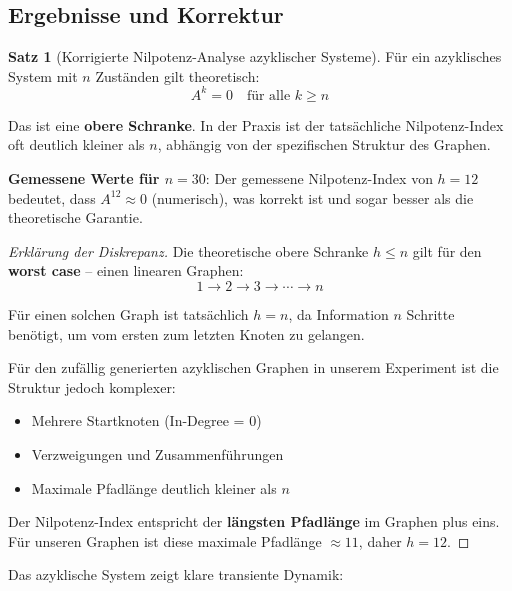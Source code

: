 ﻿\documentclass[a4paper,12pt]{report}
\theoremstyle{definition}
\newtheorem{satz}{Satz}
\begin{document}
	\subsection{Ergebnisse und Korrektur}
	
	\begin{satz}[Korrigierte Nilpotenz-Analyse azyklischer Systeme]
		Für ein azyklisches System mit $n$ Zuständen gilt theoretisch:
		\[
		A^k = 0 \quad \text{für alle } k \geq n
		\]
		
		Das ist eine \textbf{obere Schranke}. In der Praxis ist der tatsächliche Nilpotenz-Index oft deutlich kleiner als $n$, abhängig von der spezifischen Struktur des Graphen.
		
		\textbf{Gemessene Werte für $n = 30$}:
		Der gemessene Nilpotenz-Index von $h = 12$ bedeutet, dass $A^{12} \approx 0$ (numerisch), was korrekt ist und sogar besser als die theoretische Garantie.
	\end{satz}
	
	\begin{proof}[Erklärung der Diskrepanz]
		Die theoretische obere Schranke $h \leq n$ gilt für den \textbf{worst case} -- einen linearen Graphen:
		\[
		1 \to 2 \to 3 \to \cdots \to n
		\]
		
		Für einen solchen Graph ist tatsächlich $h = n$, da Information $n$ Schritte benötigt, um vom ersten zum letzten Knoten zu gelangen.
		
		Für den zufällig generierten azyklischen Graphen in unserem Experiment ist die Struktur jedoch komplexer:
		\begin{itemize}
			\item Mehrere Startknoten (In-Degree = 0)
			\item Verzweigungen und Zusammenführungen
			\item Maximale Pfadlänge deutlich kleiner als $n$
		\end{itemize}
		
		Der Nilpotenz-Index entspricht der \textbf{längsten Pfadlänge} im Graphen plus eins. Für unseren Graphen ist diese maximale Pfadlänge $\approx 11$, daher $h = 12$.
	\end{proof}
	
	Das azyklische System zeigt klare transiente Dynamik:
	
\end{document}
